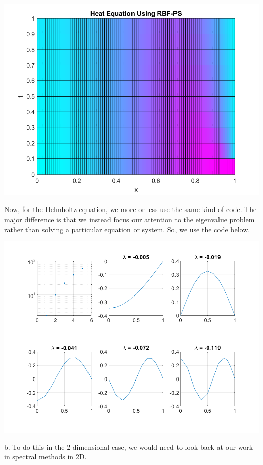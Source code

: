 \begin{solution}
\begin{center}
        \includegraphics[scale=0.5]{problem3aheat2d.png}
    \end{center}

    Now, for the Helmholtz equation, we more or less use the same kind of code. The major difference is
    that we instead focus our attention to the eigenvalue problem rather than solving a particular
    equation or system. So, we use the code below.

    \begin{center}
        \includegraphics[scale=0.8]{problem3ahelm.png}
    \end{center}

\pagebreak

    b. To do this in the 2 dimensional case, we would need to look back at our work in spectral methods
    in 2D.

\end{solution}

\newpage

\newpage
